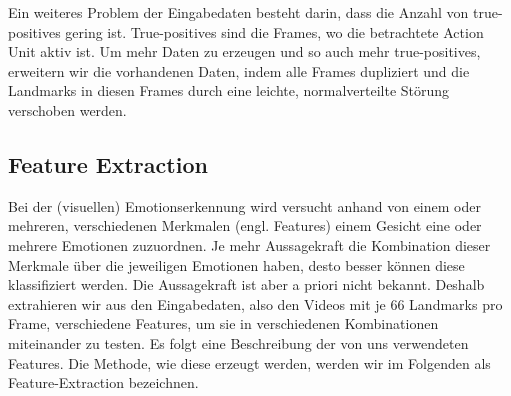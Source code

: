 Ein weiteres Problem der Eingabedaten besteht darin, dass die Anzahl von true-positives gering ist. True-positives sind die Frames, wo die betrachtete Action Unit aktiv ist.
Um mehr Daten zu erzeugen und so auch mehr true-positives, erweitern wir die vorhandenen Daten, indem alle Frames dupliziert
und die Landmarks in diesen Frames durch eine leichte, normalverteilte Störung verschoben werden.


\subsection{Feature Extraction}
Bei der (visuellen) Emotionserkennung wird versucht anhand von einem oder mehreren, verschiedenen Merkmalen (engl. Features)
einem Gesicht eine oder mehrere Emotionen zuzuordnen. Je mehr Aussagekraft die Kombination dieser Merkmale über die jeweiligen Emotionen haben,
desto besser können diese klassifiziert werden. Die Aussagekraft ist aber a priori nicht bekannt. Deshalb extrahieren wir aus den Eingabedaten, also den Videos mit je 66 Landmarks pro
Frame, verschiedene Features, um sie in verschiedenen Kombinationen miteinander zu testen. Es folgt eine Beschreibung
der von uns verwendeten Features. Die Methode, wie diese erzeugt werden, werden wir im Folgenden als Feature-Extraction bezeichnen.


